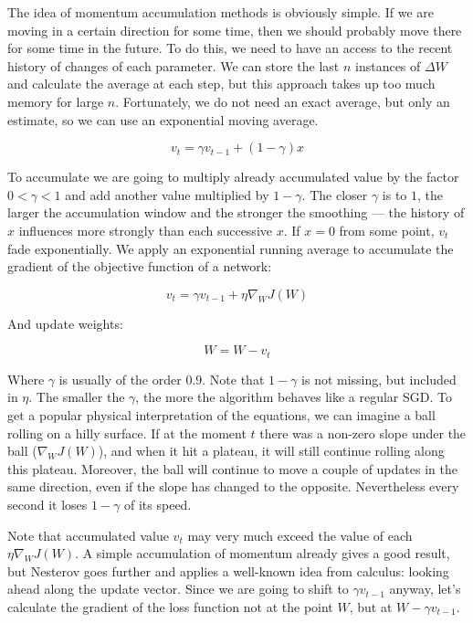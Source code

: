 The idea of momentum accumulation methods is obviously simple. If we are moving in a certain direction for some time, then we should probably move there for some time in the future. To do this, we need to have an access to the recent history of changes of each parameter. We can store the last $n$ instances of $\Delta W$ and calculate the average at each step, but this approach takes up too much memory for large $n$. Fortunately, we do not need an exact average, but only an estimate, so we can use an exponential moving average.

\begin{equation}
    \label{eq:derivative-momentum-1}
    v_t = \gamma v_{t-1} + (1-\gamma) x
\end{equation}

To accumulate we are going to multiply already accumulated value by the factor $0 < \gamma < 1$ and add another value multiplied by $1-\gamma$. The closer $\gamma$ is to $1$, the larger the accumulation window and the stronger the smoothing — the history of $x$ influences more strongly than each successive $x$. If $x=0$ from some point, $v_t$ fade exponentially. We apply an exponential running average to accumulate the gradient of the objective function of a network:

\begin{equation}
    v_t = \gamma v_{t-1} + \eta \nabla_W J(W)
\end{equation}

And update weights:

\begin{equation}
    W = W - v_t
\end{equation}

Where $\gamma$ is usually of the order $0.9$. Note that $1-\gamma$ is not missing, but included in $\eta$. The smaller the $\gamma$, the more the algorithm behaves like a regular SGD. To get a popular physical interpretation of the equations, we can imagine a ball rolling on a hilly surface. If at the moment $t$ there was a non-zero slope under the ball ($\nabla_W J(W)$), and when it hit a plateau, it will still continue rolling along this plateau. Moreover, the ball will continue to move a couple of updates in the same direction, even if the slope has changed to the opposite. Nevertheless every second it loses $1-\gamma$ of its speed.

Note that accumulated value $v_t$ may very much exceed the value of each $\eta\nabla_W J(W)$. A simple accumulation of momentum already gives a good result, but Nesterov goes further and applies a well-known idea from calculus: looking ahead along the update vector. Since we are going to shift to $\gamma v_{t-1}$ anyway, let's calculate the gradient of the loss function not at the point $W$, but at $W - \gamma v_{t-1}$.

